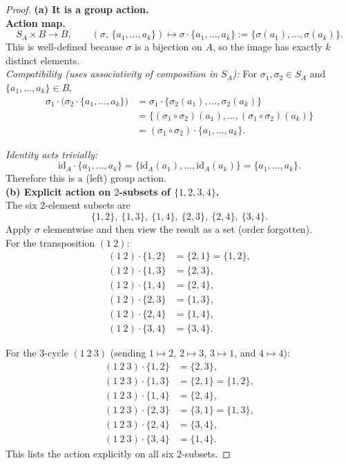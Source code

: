 \documentclass[12pt]{article}
\theoremstyle{definition}
\begin{document}
\begin{proof}
\noindent\textbf{(a) It is a group action.}\\
\noindent\textbf{Action map.} 
\[
S_A \times B \longrightarrow B,\qquad (\sigma,\,\{a_1,\dots,a_k\}) \longmapsto \sigma\cdot\{a_1,\dots,a_k\}:=\{\sigma(a_1),\dots,\sigma(a_k)\}.
\]
This is well-defined because $\sigma$ is a bijection on $A$, so the image has exactly $k$ distinct elements.\\

\noindent\emph{Compatibility (uses associativity of composition in $S_A$):}
For $\sigma_1,\sigma_2\in S_A$ and $\{a_1,\dots,a_k\}\in B$,
\begin{equation*}
\begin{aligned}
\sigma_1\cdot\bigl(\sigma_2\cdot\{a_1,\dots,a_k\}\bigr)
  &=\sigma_1\cdot\{\sigma_2(a_1),\dots,\sigma_2(a_k)\}\\
  &=\{(\sigma_1\circ\sigma_2)(a_1),\dots,(\sigma_1\circ\sigma_2)(a_k)\}\\
  &=(\sigma_1\circ\sigma_2)\cdot\{a_1,\dots,a_k\}.
\end{aligned}
\end{equation*}


\noindent\emph{Identity acts trivially:}
\[
\mathrm{id}_A\cdot\{a_1,\dots,a_k\}=\{\mathrm{id}_A(a_1),\dots,\mathrm{id}_A(a_k)\}=\{a_1,\dots,a_k\}.
\]
Therefore this is a (left) group action.\\[4pt]

\noindent\textbf{(b) Explicit action on $2$-subsets of $\{1,2,3,4\}$.}\\
The six $2$-element subsets are
\[
\{1,2\},\ \{1,3\},\ \{1,4\},\ \{2,3\},\ \{2,4\},\ \{3,4\}.
\]
Apply $\sigma$ elementwise and then view the result as a set (order forgotten).\\

\noindent For the transposition $(1\ 2)$:
\[
\begin{aligned}
(1\ 2)\cdot\{1,2\}&=\{2,1\}=\{1,2\},\\
(1\ 2)\cdot\{1,3\}&=\{2,3\},\\
(1\ 2)\cdot\{1,4\}&=\{2,4\},\\
(1\ 2)\cdot\{2,3\}&=\{1,3\},\\
(1\ 2)\cdot\{2,4\}&=\{1,4\},\\
(1\ 2)\cdot\{3,4\}&=\{3,4\}.
\end{aligned}
\]

\noindent For the $3$-cycle $(1\ 2\ 3)$ (sending $1\mapsto2$, $2\mapsto3$, $3\mapsto1$, and $4\mapsto4$):
\[
\begin{aligned}
(1\ 2\ 3)\cdot\{1,2\}&=\{2,3\},\\
(1\ 2\ 3)\cdot\{1,3\}&=\{2,1\}=\{1,2\},\\
(1\ 2\ 3)\cdot\{1,4\}&=\{2,4\},\\
(1\ 2\ 3)\cdot\{2,3\}&=\{3,1\}=\{1,3\},\\
(1\ 2\ 3)\cdot\{2,4\}&=\{3,4\},\\
(1\ 2\ 3)\cdot\{3,4\}&=\{1,4\}.
\end{aligned}
\]
This lists the action explicitly on all six $2$-subsets.
\end{proof}
\end{document}
